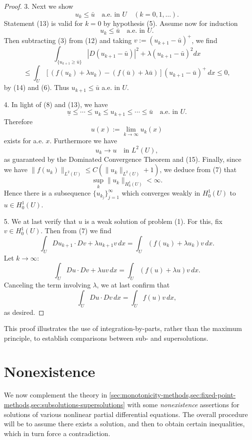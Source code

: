 \begin{proof}
3. Next we show
\[
u_k \leq \bar{u} \quad \text{a.e. in } U \quad (k = 0,1,\ldots).
\tag{13}
\]
Statement (13) is valid for $k = 0$ by hypothesis (5). Assume now for induction
\[
u_k \leq \bar{u} \quad \text{a.e. in } U.
\tag{14}
\]
Then subtracting (3) from (12) and taking $v := (u_{k+1} - \bar{u})^+$, we find
\[
\int_{\{u_{k+1} \geq \bar{u}\}} |D(u_{k+1} - \bar{u})|^2 + \lambda(u_{k+1} - \bar{u})^2 dx
\]
\[
\leq \int_U [(f(u_k) + \lambda u_k) - (f(\bar{u}) + \lambda \bar{u})](u_{k+1} - \bar{u})^+ \, dx \leq 0,
\]
by (14) and (6). Thus $u_{k+1} \leq \bar{u}$ a.e. in $U$.

4. In light of (8) and (13), we have
\[
\underline{u} \leq \cdots \leq u_k \leq u_{k+1} \leq \cdots \leq \bar{u} \quad \text{a.e. in } U.
\tag{15}
\]
Therefore
\[
u(x) := \lim_{k \to \infty} u_k(x)
\]
exists for a.e. $x$. Furthermore we have
\[
u_k \to u \quad \text{in } L^2(U),
\tag{16}
\]
as guaranteed by the Dominated Convergence Theorem and (15). Finally, since we have $\|f(u_k)\|_{L^2(U)} \leq C(\|u_k\|_{L^2(U)} + 1)$, we deduce from (7) that
\[
\sup_k \|u_k\|_{H_0^1(U)} < \infty.
\]
Hence there is a subsequence $\{u_{k_j}\}_{j=1}^\infty$ which converges weakly in $H_0^1(U)$ to $u \in H_0^1(U)$.

5. We at last verify that $u$ is a weak solution of problem (1). For this, fix $v \in H_0^1(U)$. Then from (7) we find
\[
\int_U Du_{k+1} \cdot Dv + \lambda u_{k+1} v \, dx = \int_U (f(u_k) + \lambda u_k) v \, dx.
\]
Let $k \to \infty$:
\[
\int_U Du \cdot Dv + \lambda u v \, dx = \int_U (f(u) + \lambda u) v \, dx.
\]
Canceling the term involving $\lambda$, we at last confirm that
\[
\int_U Du \cdot Dv \, dx = \int_U f(u) v \, dx,
\]
as desired.
\end{proof}

This proof illustrates the use of integration-by-parts, rather than the maximum principle, to establish comparisons between sub- and supersolutions.

\section{Nonexistence}
\label{sec:nonexistence}

We now complement the theory in \cref{sec:monotonicity-methods,sec:fixed-point-methods,sec:subsolutions-supersolutions} with some \textit{nonexistence} assertions for solutions of various nonlinear partial differential equations. The overall procedure will be to assume there exists a solution, and then to obtain certain inequalities, which in turn force a contradiction.

